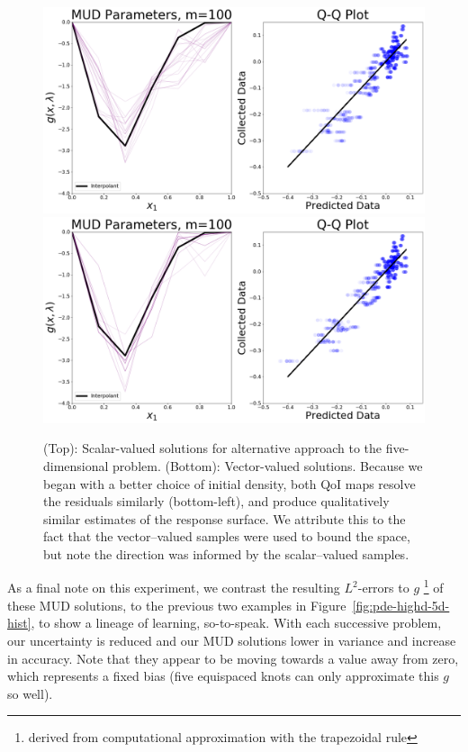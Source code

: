 \begin{figure}[htbp]
\centering
  \includegraphics[width=0.95\linewidth]{figures/pde-highd/pde-highd_pair_D-alt-5-1_m100}
  \includegraphics[width=0.95\linewidth]{figures/pde-highd/pde-highd_pair_D-alt-5-5_m100}
\caption{
(Top): Scalar-valued solutions for alternative approach to the five-dimensional problem.
(Bottom): Vector-valued solutions.
Because we began with a better choice of initial density, both QoI maps resolve the residuals similarly (bottom-left), and produce qualitatively similar estimates of the response surface. We attribute this to the fact that the vector--valued samples were used to bound the space, but note the direction was informed by the scalar--valued samples.
}
\label{fig:pde-highd-5d-alt-mud}
\end{figure}

As a final note on this experiment, we contrast the resulting $L^2$-errors to $g$ \footnote{derived from computational approximation with the trapezoidal rule} of these MUD solutions, to the previous two examples in Figure~\ref{fig:pde-highd-5d-hist}, to show a lineage of learning, so-to-speak.
With each successive problem, our uncertainty is reduced and our MUD solutions lower in variance and increase in accuracy.
Note that they appear to be moving towards a value away from zero, which represents a fixed bias (five equispaced knots can only approximate this $g$ so well).

